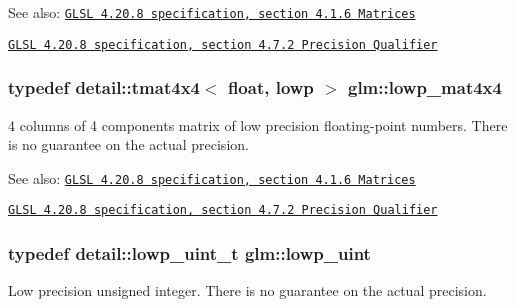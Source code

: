 \begin{Desc}
\item[See also:]\href{http://www.opengl.org/registry/doc/GLSLangSpec.4.20.8.pdf}{\tt GLSL 4.20.8 specification, section 4.1.6 Matrices} 

\href{http://www.opengl.org/registry/doc/GLSLangSpec.4.20.8.pdf}{\tt GLSL 4.20.8 specification, section 4.7.2 Precision Qualifier} \end{Desc}
\hypertarget{group__core__precision_gd31846a0565c22a0479950313c28b218}{
\subsubsection[lowp\_\-mat4x4]{\setlength{\rightskip}{0pt plus 5cm}typedef detail::tmat4x4$<$ float, lowp $>$ {\bf glm::lowp\_\-mat4x4}}}
\label{group__core__precision_gd31846a0565c22a0479950313c28b218}


4 columns of 4 components matrix of low precision floating-point numbers. There is no guarantee on the actual precision.

\begin{Desc}
\item[See also:]\href{http://www.opengl.org/registry/doc/GLSLangSpec.4.20.8.pdf}{\tt GLSL 4.20.8 specification, section 4.1.6 Matrices} 

\href{http://www.opengl.org/registry/doc/GLSLangSpec.4.20.8.pdf}{\tt GLSL 4.20.8 specification, section 4.7.2 Precision Qualifier} \end{Desc}
\hypertarget{group__core__precision_g8077c90f2c87e419ea6c273157dcc1fc}{
\subsubsection[lowp\_\-uint]{\setlength{\rightskip}{0pt plus 5cm}typedef detail::lowp\_\-uint\_\-t {\bf glm::lowp\_\-uint}}}
\label{group__core__precision_g8077c90f2c87e419ea6c273157dcc1fc}


Low precision unsigned integer. There is no guarantee on the actual precision.

